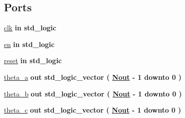 \subsection*{Ports}
 \begin{DoxyCompactItemize}
\item 
\hyperlink{classtheta__abc_a4a4609c199d30b3adebbeb3a01276ec5}{clk}  {\bfseries {\bfseries \textcolor{keywordflow}{in}\textcolor{vhdlchar}{ }}} {\bfseries \textcolor{comment}{std\+\_\+logic}\textcolor{vhdlchar}{ }} 
\item 
\hyperlink{classtheta__abc_adcf9c6f5161d039addbda5819bee64a3}{en}  {\bfseries {\bfseries \textcolor{keywordflow}{in}\textcolor{vhdlchar}{ }}} {\bfseries \textcolor{comment}{std\+\_\+logic}\textcolor{vhdlchar}{ }} 
\item 
\hyperlink{classtheta__abc_aad8dc6359d9e23dabcbf342fadf2fa06}{reset}  {\bfseries {\bfseries \textcolor{keywordflow}{in}\textcolor{vhdlchar}{ }}} {\bfseries \textcolor{comment}{std\+\_\+logic}\textcolor{vhdlchar}{ }} 
\item 
\hyperlink{classtheta__abc_ae915426336e82564b81552bb4a9106c8}{theta\+\_\+a}  {\bfseries {\bfseries \textcolor{keywordflow}{out}\textcolor{vhdlchar}{ }}} {\bfseries \textcolor{comment}{std\+\_\+logic\+\_\+vector}\textcolor{vhdlchar}{ }\textcolor{vhdlchar}{(}\textcolor{vhdlchar}{ }\textcolor{vhdlchar}{ }\textcolor{vhdlchar}{ }\textcolor{vhdlchar}{ }{\bfseries \hyperlink{classtheta__abc_ad0f475656f5dd17584d6796fde77d790}{Nout}} \textcolor{vhdlchar}{-\/}\textcolor{vhdlchar}{ } \textcolor{vhdldigit}{1} \textcolor{vhdlchar}{ }\textcolor{keywordflow}{downto}\textcolor{vhdlchar}{ }\textcolor{vhdlchar}{ } \textcolor{vhdldigit}{0} \textcolor{vhdlchar}{ }\textcolor{vhdlchar}{)}\textcolor{vhdlchar}{ }} 
\item 
\hyperlink{classtheta__abc_a0e4f34615c07a131cc3e798485768ace}{theta\+\_\+b}  {\bfseries {\bfseries \textcolor{keywordflow}{out}\textcolor{vhdlchar}{ }}} {\bfseries \textcolor{comment}{std\+\_\+logic\+\_\+vector}\textcolor{vhdlchar}{ }\textcolor{vhdlchar}{(}\textcolor{vhdlchar}{ }\textcolor{vhdlchar}{ }\textcolor{vhdlchar}{ }\textcolor{vhdlchar}{ }{\bfseries \hyperlink{classtheta__abc_ad0f475656f5dd17584d6796fde77d790}{Nout}} \textcolor{vhdlchar}{-\/}\textcolor{vhdlchar}{ } \textcolor{vhdldigit}{1} \textcolor{vhdlchar}{ }\textcolor{keywordflow}{downto}\textcolor{vhdlchar}{ }\textcolor{vhdlchar}{ } \textcolor{vhdldigit}{0} \textcolor{vhdlchar}{ }\textcolor{vhdlchar}{)}\textcolor{vhdlchar}{ }} 
\item 
\hyperlink{classtheta__abc_a2a449e4b73715ae14ae4178ad27cf5c9}{theta\+\_\+c}  {\bfseries {\bfseries \textcolor{keywordflow}{out}\textcolor{vhdlchar}{ }}} {\bfseries \textcolor{comment}{std\+\_\+logic\+\_\+vector}\textcolor{vhdlchar}{ }\textcolor{vhdlchar}{(}\textcolor{vhdlchar}{ }\textcolor{vhdlchar}{ }\textcolor{vhdlchar}{ }\textcolor{vhdlchar}{ }{\bfseries \hyperlink{classtheta__abc_ad0f475656f5dd17584d6796fde77d790}{Nout}} \textcolor{vhdlchar}{-\/}\textcolor{vhdlchar}{ } \textcolor{vhdldigit}{1} \textcolor{vhdlchar}{ }\textcolor{keywordflow}{downto}\textcolor{vhdlchar}{ }\textcolor{vhdlchar}{ } \textcolor{vhdldigit}{0} \textcolor{vhdlchar}{ }\textcolor{vhdlchar}{)}\textcolor{vhdlchar}{ }} 

\end{DoxyCompactItemize}
